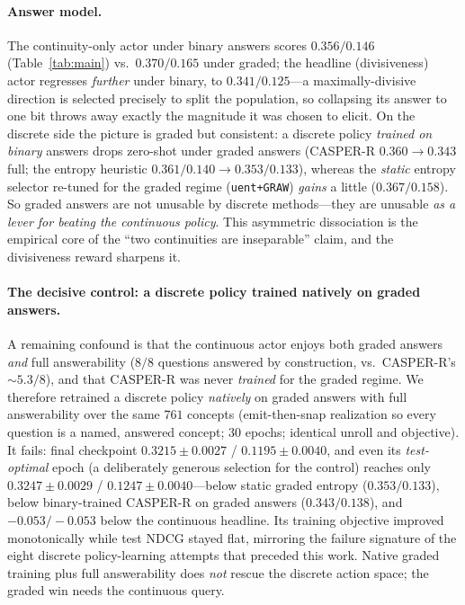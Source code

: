 \documentclass[11pt]{article}
\begin{document}
\paragraph{Answer model.} The continuity-only actor under binary answers scores $0.356/0.146$ (Table~\ref{tab:main})
vs.\ $0.370/0.165$ under graded; the headline (divisiveness) actor regresses \emph{further} under binary, to
$0.341/0.125$---a maximally-divisive direction is selected precisely to split the population, so collapsing its answer to
one bit throws away exactly the magnitude it was chosen to elicit. On the discrete side the picture is graded but
consistent: a discrete policy \emph{trained on binary} answers drops zero-shot under graded answers (CASPER-R
$0.360\!\to\!0.343$ full; the entropy heuristic $0.361/0.140\!\to\!0.353/0.133$), whereas the \emph{static} entropy
selector re-tuned for the graded regime (\texttt{uent+GRAW}) \emph{gains} a little ($0.367/0.158$). So graded answers
are not unusable by discrete methods---they are unusable \emph{as a lever for beating the continuous policy}. This
asymmetric dissociation is the empirical core of the ``two continuities are inseparable'' claim, and the divisiveness
reward sharpens it.

\paragraph{The decisive control: a discrete policy trained natively on graded answers.} A remaining confound is that
the continuous actor enjoys both graded answers \emph{and} full answerability ($8/8$ questions answered by
construction, vs.\ CASPER-R's ${\sim}5.3/8$), and that CASPER-R was never \emph{trained} for the graded regime. We
therefore retrained a discrete policy \emph{natively} on graded answers with full answerability over the same $761$
concepts (emit-then-snap realization so every question is a named, answered concept; $30$ epochs; identical unroll and
objective). It fails: final checkpoint $0.3215\pm0.0027$ / $0.1195\pm0.0040$, and even its \emph{test-optimal} epoch
(a deliberately generous selection for the control) reaches only $0.3247\pm0.0029$ / $0.1247\pm0.0040$---below static
graded entropy ($0.353/0.133$), below binary-trained CASPER-R on graded answers ($0.343/0.138$), and $-0.053/-0.053$
below the continuous headline. Its training objective improved monotonically while test NDCG stayed flat, mirroring the
failure signature of the eight discrete policy-learning attempts that preceded this work. Native graded training plus
full answerability does \emph{not} rescue the discrete action space; the graded win needs the continuous query.
\end{document}
